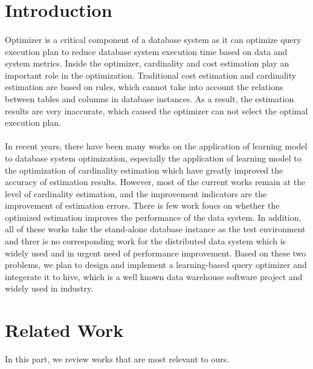 \section{Introduction}
    \paragraph{}
    Optimizer is a critical component of a database system as it can optimize query execution plan to reduce database
    system execution time based on data and system metrics. Inside the optimizer, cardinality and cost estimation play 
    an important role in the optimization. Traditional cost estimation and cardinality estimation are based on rules, 
    which cannot take into account the relations between tables and columns in database instances. As a result, the 
    estimation results are very inaccurate, which caused the optimizer can not select the optimal execution plan. 
    \paragraph{}
    In recent years, there have been many works
    \cite{marcus2019neo, yang2020neurocard,wu2021unified,yang2019deep,sun2019end} on the application of learning model 
    to database system optimization, especially the application of learning model to the optimization of cardinality 
    estimation which have greatly improved the accuracy of estimation results. However, most of the current works remain 
    at the level of cardinality estimation\cite{marcus2019neo, yang2020neurocard,wu2021unified,yang2019deep}, 
    and the improvement indicators are the improvement of estimation errors. There is few work\cite{sun2019end} 
    foucs on whether the optimized estimation improves the performance of the data system. In 
    addition, all of these works take the stand-alone database instance as the test environment and threr is no  
    corresponding work for the distributed data system which is widely used and in urgent need of performance improvement.
    Based on these two problems, we plan to design and implement a learning-based query optimizer and integerate it to 
    hive\cite{Hive}, which is a well known data warehouse software project and widely used in industry.

\section{Related Work}
    In this part, we review works that are most relevant to ours.
